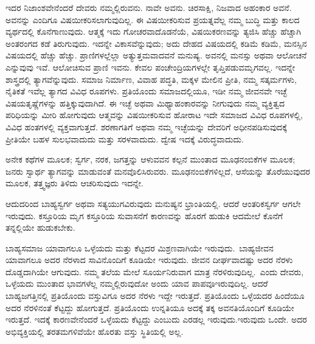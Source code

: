 ಇದರ ನಿಜಾಂಶವೇನೆಂದರೆ ದೇವರು ನಮ್ಮಲ್ಲಿರುವನು. ನಾವೇ ಅವನು. ಚಿರಸಾಕ್ಷಿ, ನಿಜವಾದ ಅಹಂಕಾರ ಅವನೆ. ಅವನನ್ನು ಎಂದಿಗೂ ವಿಷಯೀಕರಿಸಲಾಗುವುದಿಲ್ಲ. ಈ ವಿಷಯೀಕರಿಸುವ ಪ್ರಯತ್ನವೆಲ್ಲ ನಮ್ಮ ಬುದ್ಧಿ ಮತ್ತು ಕಾಲದ ವ್ಯರ್ಥದಲ್ಲಿ ಕೊನೆಗಾಣುವುದು. ಆತ್ಮಕ್ಕೆ ಇದು ಗೋಚರವಾದೊಡನೆಯೆ, ವಿಷಯಿಕರಣವನ್ನು ತ್ಯಜಿಸಿ ಹೆಚ್ಚು ಹೆಚ್ಚಾಗಿ ಅಂತರಂಗದ ಕಡೆ ತಿರುಗುವುದು. ಇದನ್ನೇ ವಿಕಾಸವೆನ್ನುವುದು; ಅದು ದೇಹದ ವಿಷಯದಲ್ಲಿ ಕಡಿಮೆ ಕಡಿಮೆ, ಮನಸ್ಸಿನ ವಿಷಯದಲ್ಲಿ ಹೆಚ್ಚು ಹೆಚ್ಚು. ಪ್ರಾಣಿಗಳಲ್ಲೆಲ್ಲಾ ಅತ್ಯುತ್ತಮವಾದವನೆ ಮನುಷ್ಯ. ಅವನಲ್ಲಿ ಮನಸ್ಸು ಅಥವಾ ಆಲೋಚನೆ ಎನ್ನುವುವು ಇವೆ. ಆಲೋಚಿಸುವ ಪ್ರಾಣಿ ಇವನು. ಕೇವಲ ಪಂಚೇಂದ್ರಿಯಗಳಲ್ಲೇ ತೃಪ್ತಿಪಡುವ\break ಮೃಗವಲ್ಲ. ಇದನ್ನೇ ಶಾಸ್ತ್ರದಲ್ಲಿ ತ್ಯಾಗವೆನ್ನುವುದು. ಸಮಾಜ ನಿರ್ಮಾಣ, ವಿವಾಹ ಪದ್ಧತಿ, ಮಕ್ಕಳ ಮೇಲಿನ ಪ್ರೀತಿ, ನಮ್ಮ ಸತ್ಕರ್ಮಗಳು, ನೈತಿಕತೆ \enginline{-} ಇವೆಲ್ಲ ತ್ಯಾಗದ ವಿವಿಧ ರೂಪಗಳು. ಪ್ರತಿಯೊಂದು ಸಮಾಜದಲ್ಲಿಯೂ, ಇಡೀ ನಮ್ಮ ಜೀವನವೇ ಇಚ್ಛೆ ವಿಷಯತೃಷ್ಣೆಗಳನ್ನು ಹತ್ತಿಕ್ಕುವುದಾಗಿದೆ. ಈ ಇಚ್ಛೆ ಅಥವಾ ಮಿಥ್ಯಾಹಂಕಾರವನ್ನು ನೀಗುವುದು\enginline{-} ನಮ್ಮ ವ್ಯಕ್ತಿತ್ವದ ಪರಿಧಿಯನ್ನು ಮೀರಿ ಹೋಗುವುದು\enginline{-} ಆತ್ಮವನ್ನು ವಿಷಯೀಕರಿಸುವ ಹೋರಾಟ \enginline{-} ಇದೇ ಸಮಾಜದ ವಿವಿಧ ರೂಪಗಳಲ್ಲಿ, ವಿವಿಧ ಹಂತಗಳಲ್ಲಿ ವ್ಯಕ್ತವಾಗುತ್ತದೆ. ಶರಣಾಗತಿಗೆ ಅಥವಾ ನಮ್ಮ ಇಚ್ಛೆಯನ್ನು ದೇವರಿಗೆ ಅಧೀನಪಡಿಸುವುದಕ್ಕೆ ಪ್ರೀತಿಯೇ ಬಹಳ ಸುಲಭವಾದುದು ಮತ್ತು ಸರಳವಾದುದು. ದ್ವೇಷ ಇದಕ್ಕೆ ವಿರುದ್ಧವಾದುದು.

ಅನೇಕ ಕಥೆಗಳ ಮೂಲಕ; ಸ್ವರ್ಗ, ನರಕ, ಜಗತ್ತನ್ನು ಆಳುವವನ ಕಲ್ಪನೆ ಮುಂತಾದ ಮೂಢನಂಬಿಕೆಗಳ ಮೂಲಕ; ಜನರು ಸ್ವಾರ್ಥ ತ್ಯಾಗವನ್ನು ಮಾಡುವಂತೆ ಮನವೊಲಿಸಿರುವರು. ಮೂಢನಂಬಿಕೆಗಳಿಲ್ಲದೆ, ಆಸೆಯನ್ನು ತೊರೆಯುವುದರ ಮೂಲಕ, ತತ್ತ್ವಜ್ಞರು ತಿಳಿದು ಆಚರಿಸುವುದು ಇದನ್ನೇ.

ಆದುದರಿಂದ ಬಾಹ್ಯಸ್ವರ್ಗ ಅಥವಾ ಸತ್ಯಯುಗವಿರುವುದು ಮನುಷ್ಯನ ಭ್ರಾಂತಿ\break ಯಲ್ಲಿ. ಆದರೆ ಆಂತರಿಕಸ್ವರ್ಗ ಆಗಲೇ ಇರುವುದು. ಕಸ್ತೂರಿಯ ಮೃಗ ಕಸ್ತೂರಿಯ ಸುವಾಸನೆಗೆ ಕಾರಣವನ್ನು ಹೊರಗೆ ಹುಡುಕಿ ಆದಮೇಲೆ ಕೊನೆಗೆ ತನ್ನಲ್ಲಿಯೇ ಹುಡುಕಬೇಕು.

ಬಾಹ್ಯಸಮಾಜ ಯಾವಾಗಲೂ ಒಳ್ಳೆಯದು ಮತ್ತು ಕೆಟ್ಟದರ ಮಿಶ್ರಣವಾಗಿಯೇ ಇರುವುದು.~ಬಾಹ್ಯಜೀವನ ಯಾವಾಗಲೂ ಅದರ ನೆರಳಾದ ಸಾವಿನೊಂದಿಗೆ ಕೂಡಿಯೇ ಇರುವುದು. ಜೀವನ ದೀರ್ಘವಾದಷ್ಟು ಅದರ ನೆರಳು ದೊಡ್ಡದಾಗಿಯೇ ಆಗುವುದು. ನಮ್ಮ ತಲೆಯ ಮೇಲೆ ಸೂರ್ಯನಿರುವಾಗ ಮಾತ್ರ ನೆರಳಿರುವುದಿಲ್ಲ.~ಎಂದು ದೇವರು, ಒಳ್ಳೆಯದು ಮುಂತಾದ ಭಾವಗಳೆಲ್ಲ ನಮ್ಮಲ್ಲಿರುವುದೋ ಅಂದು ಯಾವ ಪಾಪವೂ\break ಇರುವುದಿಲ್ಲ. ಆದರೆ ಬಾಹ್ಯಜಗತ್ತಿನಲ್ಲಿ ಪ್ರತಿಯೊಂದು ವಸ್ತುವಿಗೂ ಅದರ ನೆರಳು ಇದ್ದೇ ಇರುತ್ತದೆ. ಪ್ರತಿಯೊಂದು ಒಳ್ಳೆಯದರ ಹಿಂದೆಯೂ ಅದರ ನೆರಳಿನಂತೆ ಕೆಟ್ಟದ್ದು ಹೋಗು\break ತ್ತದೆ. ಪ್ರತಿಯೊಂದು ಉನ್ನತಿಯೂ ಅದಕ್ಕೆ ತಕ್ಕ ಅವನತಿಯೊಂದಿಗೆ ಕೂಡಿಯೇ ಇರುತ್ತದೆ. ಇದಕ್ಕೆ ಕಾರಣವೇನೆಂದರೆ ಒಳ್ಳೆಯದು ಕೆಟ್ಟದ್ದು ಎಂಬುದು ಎರಡಲ್ಲ ಇರುವುದು.\break ಇರುವುದು ಒಂದೇ. ಅದರ ಅಭಿವ್ಯಕ್ತಿಯಲ್ಲಿ ತರತಮಗಳಿವೆಯೇ ಹೊರತು ವಸ್ತು ಸ್ಥಿತಿಯಲ್ಲಿ ಅಲ್ಲ.

